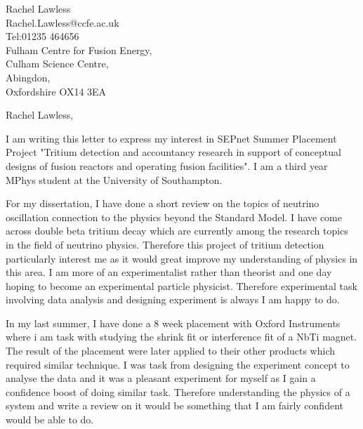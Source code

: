 \documentclass[11pt]{letter} %
\begin{document}

\begin{letter}{Rachel Lawless\\Rachel.Lawless@ccfe.ac.uk\\Tel:01235 464656\\Fulham Centre for Fusion Energy,\\Culham Science Centre,\\Abingdon,\\Oxfordshire OX14 3EA}


\opening{Rachel Lawless,} 

I am writing this letter to express my interest in SEPnet Summer Placement Project "Tritium detection and accountancy research in support of conceptual designs of fusion reactors and operating fusion facilities". I am a third year MPhys student at the University of Southampton.

For my dissertation, I have done a short review on the topics of neutrino oscillation connection to the physics beyond the Standard Model. I have come across double beta tritium decay which are currently among the research topics in the field of neutrino physics. Therefore this project of tritium detection particularly interest me as it would great improve my understanding of physics in this area. I am more of an experimentalist rather than theorist and one day hoping to become an experimental particle physicist. Therefore experimental task involving data analysis and designing experiment is always I am happy to do.

In my last summer, I have done a 8 week placement with Oxford Instruments where i am task with studying the shrink fit or interference fit of a NbTi magnet. The result of the placement were later applied to their other products which required similar technique. I was task from designing the experiment concept to analyse the data and it was a pleasant experiment for myself as I gain a confidence boost of doing similar task. Therefore understanding the physics of a system and write a review on it would be something that I am fairly confident would be able to do. 


\end{letter}
\end{document}
